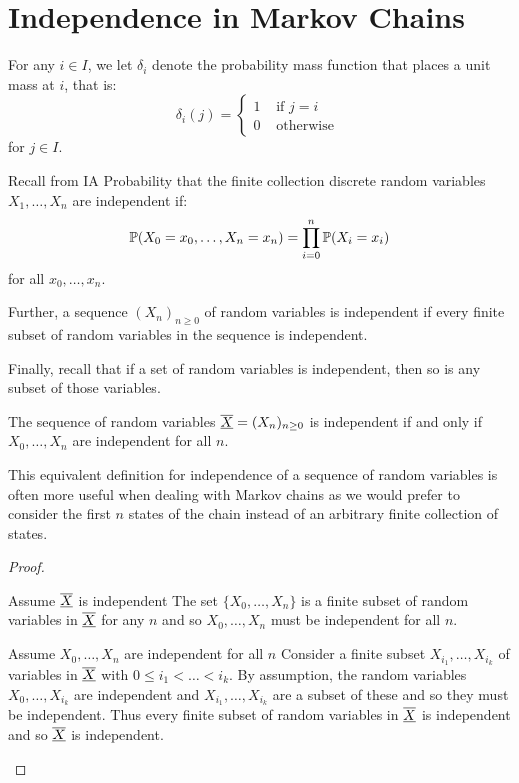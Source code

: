 \documentclass[../main.tex]{subfiles}
\begin{document}
\section{Independence in Markov Chains}
\begin{definition}
  For any $i \in I$, we let $\delta_i$ denote the probability mass function that places a unit mass at $i$, that is:
  \[
    \delta_{i}(j) = \begin{cases}
    1 & \text{ if } j = i \\
    0 & \text{ otherwise }
    \end{cases}
  \]
  for $j \in I$.
\end{definition}
\begin{remark}[Recap]
  Recall from IA Probability that the finite collection discrete random variables $X_1, \ldots, X_n$ are independent if:
  \[
    \P(X_0 = x_0, \ldots, X_n = x_n) = \prod_{i = 0}^{n} \P(X_i = x_i)
  \]
  for all $x_0, \ldots, x_n$.

  Further, a sequence $(X_n)_{n \geq 0}$ of random variables is independent if every finite subset of random variables in the sequence is independent.

  Finally, recall that if a set of random variables is independent, then so is any subset of those variables.
\end{remark}
\begin{lemma}
  The sequence of random variables $\mchain{X} = (X_n)_{n \geq 0}$ is independent if and only if $X_0, \ldots, X_n$ are independent for all $n$.
\end{lemma}
\begin{remark}
  This equivalent definition for independence of a sequence of random variables is often more useful when dealing with Markov chains as we would prefer to consider the first $n$ states of the chain instead of an arbitrary finite collection of states.
\end{remark}
\begin{proof}
  \begin{proofdirection}{Assume $\mchain{X}$ is independent}
    The set $\{X_0, \ldots, X_n\}$ is a finite subset of random variables in $\mchain{X}$ for any $n$ and so $X_0, \ldots, X_n$ must be independent for all $n$.
  \end{proofdirection}
  \begin{proofdirection}{Assume $X_0, \ldots, X_n$ are independent for all $n$}
    Consider a finite subset $X_{i_1}, \ldots, X_{i_k}$ of variables in $\mchain{X}$ with $0 \leq i_1 < \ldots < i_k$.
    By assumption, the random variables $X_0, \ldots, X_{i_k}$ are independent and $X_{i_1}, \ldots, X_{i_k}$ are a subset of these and so they must be independent.
    Thus every finite subset of random variables in $\mchain{X}$ is independent and so $\mchain{X}$ is independent.
  \end{proofdirection}
\end{proof}
\end{document}
